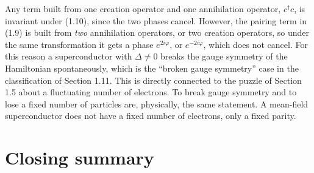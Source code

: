 Any term built from one creation operator and one annihilation operator, $c^\dagger c$, is invariant
under (1.10), since the two phases cancel. However, the pairing term in (1.9) is built from
\emph{two} annihilation operators, or two creation operators, so under the same transformation it
gets a phase $e^{2i\varphi}$, or $e^{-2i\varphi}$, which does not cancel. For this reason a
superconductor with $\Delta \neq 0$ breaks the gauge symmetry of the Hamiltonian spontaneously, which
is the ``broken gauge symmetry'' case in the classification of Section 1.11. This is directly
connected to the puzzle of Section 1.5 about a fluctuating number of electrons. To break gauge
symmetry and to lose a fixed number of particles are, physically, the same statement. A mean-field
superconductor does not have a fixed number of electrons, only a fixed parity.

\section{Closing summary}

